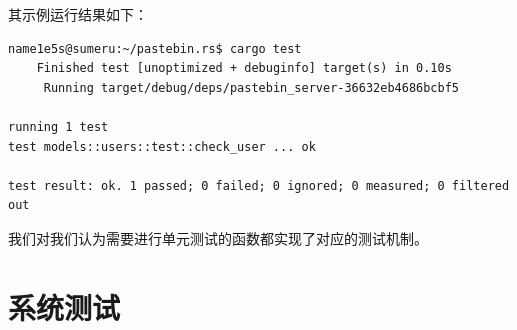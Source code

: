 \documentclass[ichigo,normal,cn]{elegantnote}
\begin{document}
其示例运行结果如下：

\begin{lstlisting}
name1e5s@sumeru:~/pastebin.rs$ cargo test
    Finished test [unoptimized + debuginfo] target(s) in 0.10s
     Running target/debug/deps/pastebin_server-36632eb4686bcbf5

running 1 test
test models::users::test::check_user ... ok

test result: ok. 1 passed; 0 failed; 0 ignored; 0 measured; 0 filtered out
\end{lstlisting}

我们对我们认为需要进行单元测试的函数都实现了对应的测试机制。

\section{系统测试}
\end{document}
